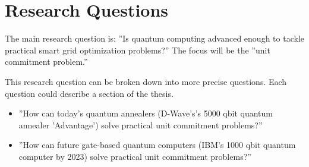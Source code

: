 \section{Research Questions}

The main research question is:
''Is quantum computing advanced enough to tackle practical
smart grid optimization problems?''
The focus will be the ''unit commitment problem.''

This research question can be broken down into more precise questions.
Each question could describe a section of the thesis.
\begin{itemize}
  \item ''How can today's quantum annealers (D-Wave's's 5000 qbit quantum annealer 'Advantage') solve practical unit commitment problems?''
  \item ''How can future gate-based quantum computers (IBM's 1000 qbit quantum computer by 2023) solve practical unit commitment problems?''
\end{itemize}